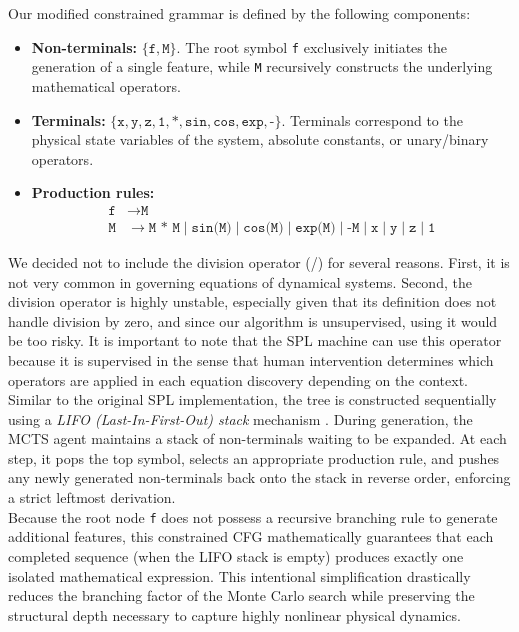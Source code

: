 \documentclass[11pt, a4paper]{article}
\begin{document}
Our modified constrained grammar is defined by the following components:
\begin{itemize}
    \item \textbf{Non-terminals:} $\{\texttt{f}, \texttt{M}\}$. The root symbol \texttt{f} exclusively initiates the generation of a single feature, while \texttt{M} recursively constructs the underlying mathematical operators.
    \item \textbf{Terminals:} $\{\texttt{x}, \texttt{y}, \texttt{z}, \texttt{1}, \texttt{*}, \texttt{sin}, \texttt{cos}, \texttt{exp}, \texttt{-}\}$. Terminals correspond to the physical state variables of the system, absolute constants, or unary/binary operators.
    \item \textbf{Production rules:}
    \begin{equation}
        \begin{array}{ll}
            \texttt{f} &\rightarrow \texttt{M} \\
            \texttt{M} &\rightarrow \texttt{M * M} \mid \texttt{sin(M)} \mid \texttt{cos(M)} \mid \texttt{exp(M)} \mid \texttt{-M} \mid \texttt{x} \mid \texttt{y} \mid \texttt{z} \mid \texttt{1}
        \end{array}
    \end{equation}
\end{itemize}


We decided not to include the division operator (/) for several reasons. First, it is not very common in governing equations of dynamical systems. Second, the division operator is highly unstable, especially given that its definition does not handle division by zero, and since our algorithm is unsupervised, using it would be too risky. It is important to note that the SPL machine can use this operator because it is supervised in the sense that human intervention determines which operators are applied in each equation discovery depending on the context.\\

Similar to the original SPL implementation, the tree is constructed sequentially using a \textit{LIFO (Last-In-First-Out) stack} mechanism \cite{sun2023spl}. During generation, the MCTS agent maintains a stack of non-terminals waiting to be expanded. At each step, it pops the top symbol, selects an appropriate production rule, and pushes any newly generated non-terminals back onto the stack in reverse order, enforcing a strict leftmost derivation.\\

Because the root node \texttt{f} does not possess a recursive branching rule to generate additional features, this constrained CFG mathematically guarantees that each completed sequence (when the LIFO stack is empty) produces exactly one isolated mathematical expression. This intentional simplification drastically reduces the branching factor of the Monte Carlo search while preserving the structural depth necessary to capture highly nonlinear physical dynamics.\\
\end{document}
